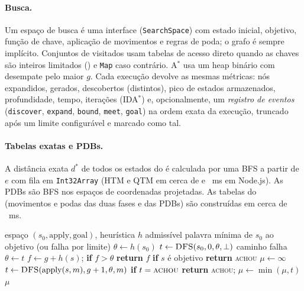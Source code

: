 \paragraph{Busca.} Um espaço de busca é uma interface (\texttt{SearchSpace}) com estado inicial, objetivo, função de chave, aplicação de movimentos e regras de poda; o grafo é sempre implícito. Conjuntos de visitados usam tabelas de acesso direto quando as chaves são inteiros limitados () e \texttt{Map} caso contrário. A$^*$ usa um heap binário com desempate pelo maior $g$. Cada execução devolve as mesmas métricas: nós expandidos, gerados, descobertos (distintos), pico de estados armazenados, profundidade, tempo, iterações (IDA$^*$) e, opcionalmente, um \emph{registro de eventos} (\texttt{discover}, \texttt{expand}, \texttt{bound}, \texttt{meet}, \texttt{goal}) na ordem exata da execução, truncado após um limite configurável e marcado como tal.

\paragraph{Tabelas exatas e PDBs.} A distância exata $d^*$ de todos os estados do  é calculada por uma BFS a partir de $e$ com fila em \texttt{Int32Array} (HTM e QTM em cerca de \gclBfsTimeHTM{} e \gclBfsTimeQTM{}~ms em Node.js). As PDBs são BFS nos espaços de coordenadas projetadas. As tabelas do  (movimentos e podas das duas fases e das PDBs) são construídas em cerca de \gclTwoPhaseTables{}~ms.

\begin{algorithm}[t]
\caption{IDA$^*$ com poda canônica, como implementado (\texttt{search/algorithms.ts}).}\label{alg:ida}
\begin{algorithmic}[1]
\Require espaço $(s_0,\mathrm{apply},\mathrm{goal})$, heurística $h$ admissível
\Ensure palavra mínima de $s_0$ ao objetivo (ou falha por limite)
\State $\theta\gets h(s_0)$
\Loop
  \State $t\gets\Call{DFS}{s_0,0,\theta,\bot}$
   \Return caminho \EndIf
   \Return falha \EndIf
  \State $\theta\gets t$ 
\EndLoop
{}
  \State $f\gets g+h(s)$; \textbf{if} $f>\theta$ \textbf{return} $f$
  \State \textbf{if} $s$ é objetivo \textbf{return} \textsc{achou}
  \State $\mu\gets\infty$
     \State $t\gets\Call{DFS}{\mathrm{apply}(s,m),g+1,\theta,m}$
     \State \textbf{if} $t=\textsc{achou}$ \textbf{return} \textsc{achou}; $\mu\gets\min(\mu,t)$
  \EndFor
  \State \Return $\mu$
\EndFunction
\end{algorithmic}
\end{algorithm}

